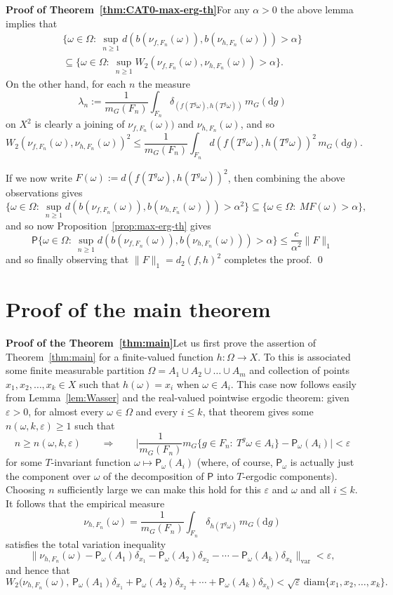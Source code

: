 \documentclass{amsart}
\theoremstyle{remark}
\renewcommand{\rm}[1]{\mathrm{#1}}
\newcommand{\sfP}{\mathsf{P}}
\renewcommand{\d}{\mathrm{d}}
\renewcommand{\O}{\Omega}
\renewcommand{\a}{\alpha}
\newcommand{\eps}{\varepsilon}
\renewcommand{\l}{\lambda}
\newcommand{\w}{\omega}
\begin{document}
\textbf{Proof of Theorem~\ref{thm:CAT0-max-erg-th}}\quad For any $\a
> 0$ the above lemma implies that
\begin{multline*}
\{\w \in \O:\ \sup_{n\geq 1}d(b(\nu_{f,F_n}(\w)),b(\nu_{h,F_n}(\w)))
> \a\}\\ \subseteq \{\w \in \O:\ \sup_{n\geq
1}W_2(\nu_{f,F_n}(\w),\nu_{h,F_n}(\w)) > \a\}.
\end{multline*}
On the other hand, for each $n$ the measure
\[\l_n := \frac{1}{m_G(F_n)}\int_{F_n}\delta_{(f(T^g\w),h(T^g\w))}\,m_G(\d g)\]
on $X^2$ is clearly a joining of $\nu_{f,F_n}(\w))$ and
$\nu_{h,F_n}(\w)$, and so
\[W_2(\nu_{f,F_n}(\w),\nu_{h,F_n}(\w))^2 \leq \frac{1}{m_G(F_n)}\int_{F_n}d(f(T^g\w),h(T^g\w))^2\,m_G(\d g).\]

If we now write $F(\w) := d(f(T^g\w),h(T^g\w))^2$, then combining
the above observations gives
\[\{\w \in \O:\ \sup_{n\geq
1}d(b(\nu_{f,F_n}(\w)),b(\nu_{h,F_n}(\w))) > \a^2\} \subseteq \{\w
\in \O:\ MF(\w) > \a\},\] and so now
Proposition~\ref{prop:max-erg-th} gives
\[\sfP\{\w \in \O:\ \sup_{n\geq
1}d(b(\nu_{f,F_n}(\w)),b(\nu_{h,F_n}(\w))) > \a\} \leq
\frac{c}{\a^2}\|F\|_1\] and so finally observing that $\|F\|_1 =
d_2(f,h)^2$ completes the proof. \qed

\section{Proof of the main theorem}\label{sec:mainproof}

\textbf{Proof of the Theorem~\ref{thm:main}}\quad Let us first prove
the assertion of Theorem~\ref{thm:main} for a finite-valued function
$h:\O\to X$.  To this is associated some finite measurable partition
$\O = A_1 \cup A_2 \cup \ldots \cup A_m$ and collection of points
$x_1,x_2,\ldots,x_k \in X$ such that $h(\w) = x_i$ when $\w \in
A_i$. This case now follows easily from Lemma~\ref{lem:Wasser} and
the real-valued pointwise ergodic theorem: given $\eps > 0$, for
almost every $\w \in \O$ and every $i \leq k$, that theorem gives
some $n(\w,k,\eps) \geq 1$ such that
\[n\geq n(\w,k,\eps) \quad\quad\Rightarrow\quad\quad
\Big|\frac{1}{m_G(F_n)}m_G\{g\in F_n:\ T^g\w\in A_i\} -
\sfP_\omega(A_i)\Big| < \eps\] for some $T$-invariant function $\omega \mapsto \sfP_\omega(A_i)$ (where, of course, $\sfP_\omega$ is actually just the component over $\omega$ of the decomposition of $\sfP$ into $T$-ergodic components). Choosing $n$ sufficiently large we
can make this hold for this $\eps$ and $\w$ and all $i \leq k$. It
follows that the empirical measure
\[\nu_{h,F_n}(\w) = \frac{1}{m_G(F_n)}\int_{F_n}\delta_{h(T^g\w)}\,m_G(\d g)\]
satisfies the total variation inequality
\[\|\nu_{h,F_n}(\w) - \sfP_\omega(A_1)\delta_{x_1} - \sfP_\omega(A_2)\delta_{x_2} - \cdots - \sfP_\omega(A_k)\delta_{x_k}\|_{\rm{var}} < \eps,\]
and hence that
\[W_2\big(\nu_{h,F_n}(\w),\,\sfP_\omega(A_1)\delta_{x_1} + \sfP_\omega(A_2)\delta_{x_2} + \cdots + \sfP_\omega(A_k)\delta_{x_k}\big) < \sqrt{\eps}\,\rm{diam}\{x_1,x_2,\ldots,x_k\}.\]
\end{document}
